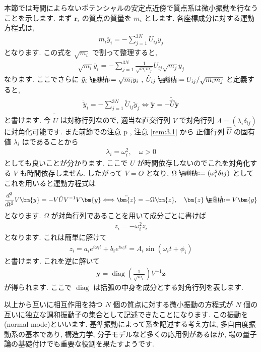 \documentclass[openany, a4paper, oneside]{jsbook}
\makeatletter
\newcommand*{\defeq}{\mathrel{\rlap{%
\raisebox{0.3ex}{$\m@th\cdot$}}%
\raisebox{-0.3ex}{$\m@th\cdot$}}%
=}
\DeclareMathOperator{\diag}{diag}
\theoremstyle{break}
\theoremstyle{breakdefn}
\makeatother
\begin{document}
本節では時間によらないポテンシャルの安定点近傍で質点系は微小振動を行なうことを示します.
まず $\bm{r}_i$ の質点の質量を $m_i$ とします.
各座標成分に対する運動方程式は,
\begin{align}
m_i \ddot{ y_i }
=
-\sum_{j=1}^{3N} U_{ij} y_j
\end{align}
となります. この式を $\sqrt{m_i}$ で割って整理すると,
\begin{align}
\sqrt{m_i} \ddot{ y_i }
=
-\sum_{j=1}^{3N} \frac{1} {\sqrt{m_i m_j}} U_{ij} \sqrt{m_j} y_j
\end{align}
なります. ここでさらに
$\tilde{y}_i \defeq \sqrt{m_i} y_i$ ,  $\tilde{U}_{ij} \defeq U_{ij}/\sqrt{ m_i m_j }$ と定義すると,
\begin{gather}
\ddot{ \tilde{y} }_i
=
-\sum_{j=1}^{3N} \tilde{ U }_{ij} \tilde{y}_j
\Longleftrightarrow
\tilde{ \bm{y} }
=
-\tilde{ \hat{U} } \tilde{ \bm{y} }
\end{gather}
と書けます.
今 $\tilde{ \hat{U} }$ は対称行列なので, 適当な直交行列 $V$ で対角行列 $\Lambda = ( \lambda_i \delta_{ij} )$ に対角化可能です.
また前節での注意 p \pageref{rem:3.1}, 注意 \ref{rem:3.1} から
正値行列 $\hat{U}$ の固有値 $\lambda_i$ はであることから
\begin{align}
\lambda _i
=
\omega _i ^2, \quad
\omega > 0
\end{align}
としても良いことが分かります.
ここで $U$ が時間依存しないのでこれを対角化する $V$ も時間依存しません.
したがって $\dot{V}=O$ となり,  $\Omega \defeq ( \omega_i^2 \delta{ij} )$ としてこれを用いると運動方程式は
\begin{gather}
\frac{d^2} {dt^2} V \bm{y}
=
-V \hat{U} V^{-1} V \bm{y}
\Longleftrightarrow
\ddot{ \bm{z} }
=
-\Omega \bm{z}, \quad
\bm{z} \defeq V \bm{y}
\end{gather}
となります.
$\Omega$ が対角行列であることを用いて成分ごとに書けば
\begin{align}
\ddot{z}_i
=
-\omega_i ^2 z_i
\end{align}
となります.
これは簡単に解けて
\begin{align}
z_i
=
a_i e^{ i \omega_i t} + b_i e^{ i \omega_i t }
=
A_i \sin ( \omega_i t + \phi_i )
\end{align}
と書けます. これを逆に解いて
\begin{align}
\bm{y}
=
\diag \left ( \frac{1} { \sqrt{m_i} } \right) V^{-1} \bm{z}
\end{align}
が得られます.
ここで $\diag$ は括弧の中身を成分とする対角行列を表します.

以上から互いに相互作用を持つ $N$ 個の質点に対する微小振動の方程式が
$N$ 個の互いに独立な調和振動子の集合として記述できたことになります.
この振動を(normal mode)といいます.
基準振動によって系を記述する考え方は, 多自由度振動系の基本であり,
構造力学, 分子モデルなど多くの応用例があるほか, 場の量子論の基礎付けでも重要な役割を果たすようです.
\end{document}
